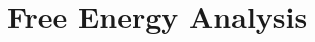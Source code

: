 \documentclass{article}
\begin{document}
\linespread{1.0}
\justify

\section{Free Energy Analysis}

\end{document}
